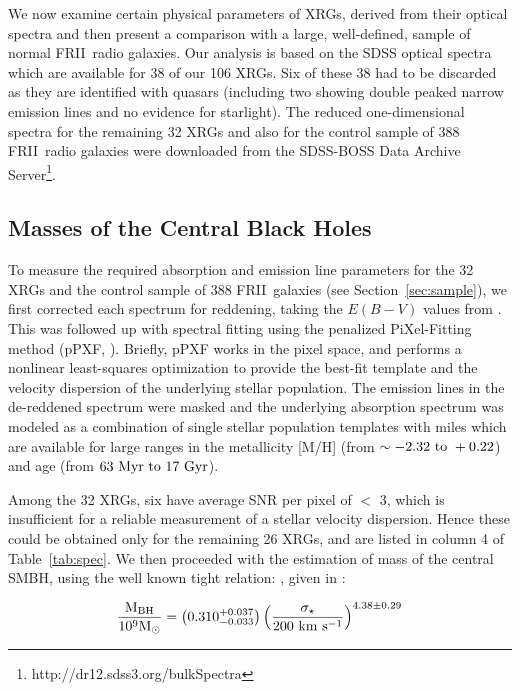 \documentclass[twocolumn]{aastex62}
\def\frii{FR{II}~}
\begin{document}
We now examine certain physical parameters of XRGs, derived
from their optical spectra and then present a comparison with a large,
well-defined, sample of normal \frii radio galaxies. Our analysis is
based on the SDSS optical spectra which are available for 38 of our
106 XRGs. Six of these 38 had to be discarded as they are identified with 
quasars (including two showing double peaked narrow emission lines and 
no evidence for starlight). The reduced one-dimensional spectra for the 
remaining 32 XRGs and also for the control sample of 388 \frii radio 
galaxies were downloaded from the SDSS-BOSS Data Archive 
Server\footnote{http://dr12.sdss3.org/bulkSpectra}.


\subsection{Masses of the Central Black Holes} 
\label{subsec:bhmass}
To measure the required absorption and emission line parameters for
the 32 XRGs and the control sample of 388 \frii galaxies (see
Section~\ref{sec:sample}), we first corrected each spectrum for
reddening, taking the $E(B-V)$ values from
 \citet{Schlegel1998ApJ...500..525S}. This was followed up with
spectral fitting using the penalized PiXel-Fitting method (pPXF,
 \citealt{Cappellari2004PASP..116..138C,
  Cappellari2017MNRAS.466..798C}). Briefly, pPXF works in the pixel
space, and performs a nonlinear least-squares optimization to provide
the best-fit template and the velocity dispersion of the underlying
stellar population. The emission lines in the de-reddened spectrum
were masked and the underlying absorption spectrum was modeled as a
combination of single stellar population templates with {\sc miles}
 \citep{Vazdekis2010MNRAS.404.1639V} which are available for large
ranges in the metallicity [M/H] (from $\sim \rm -2.32\ to\ +0.22$) and
age (from $\rm 63\ Myr\ to\ 17\ Gyr$).

Among the 32 XRGs, six have average SNR per pixel of $<$ 3, which is
insufficient for a reliable measurement of  a stellar velocity dispersion.
Hence these could be obtained only for the remaining 26 XRGs, and are
listed in column 4 of Table~\ref{tab:spec}. We then proceeded with
the estimation of mass of the central SMBH, using the well known 
tight relation:
  \citep{Ferrarese2001ApJ...555L..79F,Gebhardt2000ApJ...539L..13G,
  Tremaine2002ApJ...574..740T}, given in
 \citet[][see their equation 3 and 7]{Kormendy2013ARA&A..51..511K}:

\begin{equation}
\rm  \frac{M_{\rm BH}}{10^9 M_{\odot}}  = \left(0.310^{+0.037}_{-0.033}\right) 
\left(\frac{\sigma_{\star}} {200\ {km\ s^{-1}}}\right)^{4.38\pm0.29}  
\label{eq1}
\end{equation}
\end{document}
